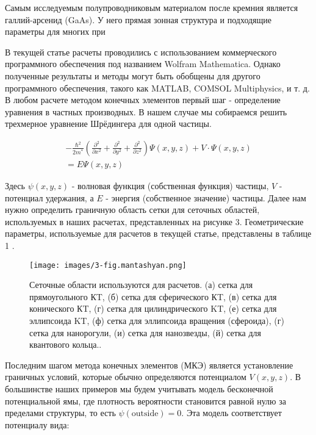 \documentclass[a4paper,14pt]{extarticle}
\begin{document}
Самым исследуемым полупроводниковым материалом после кремния является галлий-арсенид (GaAs). У него прямая зонная структура и подходящие параметры для многих при

В текущей статье расчеты проводились с использованием коммерческого программного обеспечения под названием Wolfram Mathematica. Однако полученные результаты и методы могут быть обобщены для другого программного обеспечения, такого как MATLAB,\cite{mantashyan} COMSOL Multiphysics, и т. д. В любом расчете методом конечных элементов первый шаг - определение уравнения в частных производных. В нашем случае мы собираемся решить трехмерное уравнение Шрёдингера для одной частицы.\cite{mantashyan}

\begin{eqnarray}
    -\frac{\hbar^{2}}{2m^*} \left( \frac{\partial^2 }{\partial x^2} + \frac{\partial^2 }{\partial y^2} + \frac{\partial^2 }{\partial z^2} \right)\Psi(x,y,z) + V\cdot\Psi(x,y,z) \nonumber \\ = E\Psi(x, y, z)
    \end{eqnarray}

Здесь \(\psi(x, y, z)\) - волновая функция (собственная функция) частицы, \(V\) - потенциал удержания, а \(E\) - энергия (собственное значение) частицы. Далее нам нужно определить граничную область сетки для сеточных областей, используемых в наших расчетах, представленных на рисунке 3. Геометрические параметры, используемые для расчетов в текущей статье, представлены в таблице 1 \cite{mantashyan} .

\begin{figure}[htbp]
    \centering
    \texttt{[image: images/3-fig.mantashyan.png]}
    \caption{\label{fig:mantashyan2} Сеточные области используются для расчетов. (а) сетка для прямоугольного КT, (б) сетка для сферического КT, (в) сетка для конического КT, (г) сетка для цилиндрического KT, (е) сетка для эллипсоида KT, (ф) сетка для эллипсоида вращения (сфероида), (г) сетка для нанорогули, (и) сетка для нанозвезды, (й) сетка для квантового кольца.\cite{mantashyan}.}
\end{figure}

Последним шагом метода конечных элементов (МКЭ) является установление граничных условий, которые обычно определяются потенциалом \( V(x, y, z) \). В большинстве наших примеров мы будем учитывать модель бесконечной потенциальной ямы, где плотность вероятности становится равной нулю за пределами структуры, то есть \( \psi(\text{outside}) = 0 \). Эта модель соответствует потенциалу вида:
\end{document}
